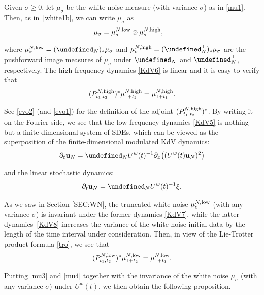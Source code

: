 \documentclass[letterpaper, 11pt,  reqno]{amsart}
\newcommand{\1}{\hspace{0.5mm}\text{I}\hspace{0.5mm}}
\newcommand{\noi}{\noindent}
\let\P= \undefined
\newcommand{\P}{\mathbf{P}}
\newcommand{\low}{\textup{low}}
\newcommand{\high}{\textup{high}}
\newcommand{\s}{\sigma}
\newcommand{\dx}{\partial_x}
\newcommand{\dt}{\partial_t}
\newcommand{\uw}{U^w}
\newcommand{\uu}{\mathbf{u}}
\numberwithin{equation}{section}
\numberwithin{theorem}{section}
\begin{document}
Given $\s \ge 0$, let $\mu_\s$ be the white noise measure (with variance $\s$)
as in \eqref{mu1}.
Then, as in~\eqref{white1b}, we can write $\mu_\s$ as
\begin{align*}
 \mu_\s 
 & =  \mu_\s^{N, \low} \otimes \mu_\s^{N, \high}, 
\end{align*}

\noi
where $\mu_\s^{N, \low} = (\P_N)_* \mu_\s$ and 
$\mu_\s^{N, \high} = (\P_N^\perp)_* \mu_\s$
are 
the pushforward image measures of $\mu_\s$ under
$\P_N$ and $\P_N^\perp$, respectively.
The high frequency dynamics \eqref{KdV6}
is linear and it is easy to verify 
that 
\begin{align}
(P^{N, \high}_{t_1, t_2})^* \mu^{N, \high}_{1+t_2}
=   \mu^{N, \high}_{1+t_1 }.
\label{mu3}
\end{align}

\noi
See \eqref{evo2} (and \eqref{evo1})
for the definition of the adjoint $(P^{N, \high}_{t_1, t_2})^*$.
By writing it on the Fourier side, 
we see that the low frequency dynamics \eqref{KdV5}
is nothing but a finite-dimensional system of SDEs,
which can be viewed as the superposition of 
the finite-dimensional modulated KdV dynamics:
\begin{align}
\dt \uu_N = \P_N\uw(t)^{-1} \dx\big( ( \uw(t) \uu_N)^2\big)
\label{KdV7}
\end{align}

\noi
and the linear stochastic dynamics:
\begin{align}
\dt \uu_N = 
 \P_N  \uw(t)^{-1} \xi.
\label{KdV8}
\end{align}

\noi
As we saw in Section \ref{SEC:WN}, 
the truncated white noise $\mu_\s^{N, \low}$ (with any variance $\s$)
is invariant under  the former dynamics \eqref{KdV7}, 
while 
the latter dynamics~\eqref{KdV8}
increases the variance of the white noise initial data by the length of the time interval under consideration.
Then, in view of the Lie-Trotter product formula \eqref{tro}, 
we see that 
\begin{align}
(P^{N, \low}_{t_1, t_2})^* \mu^{N, \low}_{1+t_2}
=   \mu^{N, \low}_{1+t_1 }.
\label{mu4}
\end{align}



\noi
Putting \eqref{mu3} and \eqref{mu4} together
with the invariance of the white noise $\mu_\s$ (with any variance $\s$)
under $\uw(t)$, 
we then obtain the following proposition.
\end{document}
